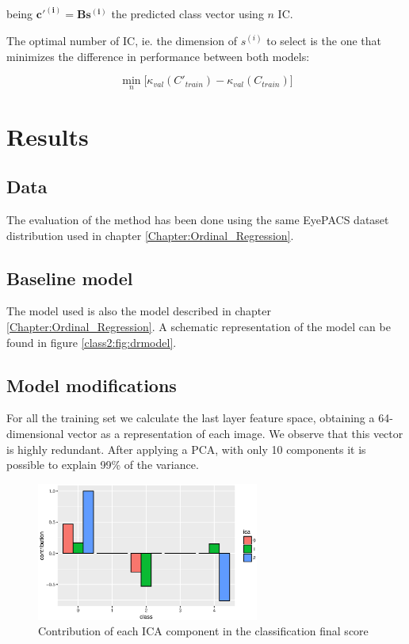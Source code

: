 being $\boldsymbol{c'^{(i)}} = \boldsymbol{B} \boldsymbol{s^{(i)}}$ the predicted class vector using $n$ IC.

The optimal number of IC, ie. the dimension of $s^{(i)}$ to select is the one that minimizes the difference in performance between both models:

\begin{equation}
\min_{n} \big[ \kappa_{val} (C'_{train}) - \kappa_{val} (C_{train}) \big] 
\end{equation}

\section{Results}\label{sec:results}

\subsection{Data}

The evaluation of the method has been done using the same EyePACS dataset distribution used in chapter \ref{Chapter:Ordinal_Regression}.

\subsection{Baseline model}

The model used is also the model described in chapter \ref{Chapter:Ordinal_Regression}. A schematic representation of the model can be found in figure \ref{class2:fig:drmodel}.

\subsection{Model modifications}

For all the training set we calculate the last layer feature space, obtaining a 64-dimensional vector as a representation of each image. We observe that this vector is highly redundant. After applying a PCA, with only 10 components it is possible to explain 99\% of the variance.

\begin{figure}[h]
	\centering	
	\includegraphics[width=0.65\textwidth]{Figures/chapter_ica/figures/ica_class_contribution.eps}
	\caption{Contribution of each ICA component in the classification final score}
	\label{fig:ica_contribution}
\end{figure}

